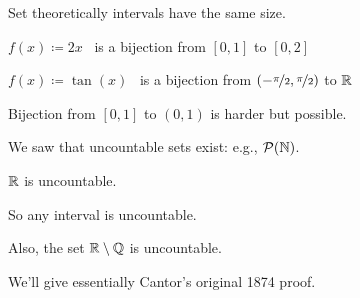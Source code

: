 \documentclass[10pt,aspectratio=149]{beamer}
\begin{document}
\begin{frame}
Set theoretically intervals have the same size.

\medskip
\pause

$f(x)\coloneqq 2x$ ~is a bijection from $[0,1]$ to $[0,2]$

\medskip
\pause

$f(x) \coloneqq \tan(x)$ ~is a bijection from $(-\nicefrac{\pi}{2},\nicefrac{\pi}{2})$ to ${\mathbb{R}}$

\medskip
\pause

Bijection from $[0,1]$ to $(0,1)$ is harder but possible.

\medskip
\pause

We saw that uncountable sets exist: e.g., ${\mathcal{P}}({\mathbb{N}})$.

\pause

\begin{theorem}[Cantor]
${\mathbb{R}}$ is uncountable.
\end{theorem}

\pause

So any interval is uncountable.

\medskip
\pause

Also, the set ${\mathbb{R}} \setminus {\mathbb{Q}}$ is uncountable.

\medskip
\pause

We'll give essentially Cantor's original 1874 proof.

\end{frame}
\end{document}
